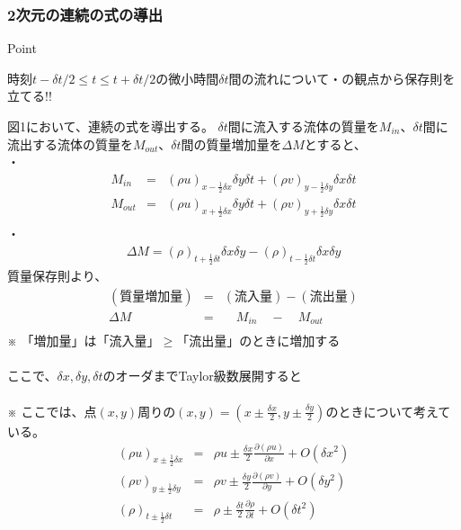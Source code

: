 \documentclass[a4paper]{jsarticle}
\begin{document}
\subsubsection{2次元の連続の式の導出}
\begin{itembox}[l]{Point}
    \begin{center}
        時刻$t-\delta t/2\leq t \leq t+\delta t/2$の微小時間$\delta t$間の流れについて・の観点から保存則を立てる!!
    \end{center}
\end{itembox}
図1において、連続の式を導出する。
\noindent$\delta t$間に流入する流体の質量を$M_{in}$、$\delta t$間に流出する流体の質量を$M_{out}$、$\delta t$間の質量増加量を$\Delta M$とすると、\\
・
\begin{eqnarray*}
    M_{in}&=&\left(\rho u\right)_{x-\frac{1}{2}\delta x}\delta y \delta t+\left(\rho v\right)_{y-\frac{1}{2}\delta y}\delta x \delta t\\
    M_{out}&=&\left(\rho u\right)_{x+\frac{1}{2}\delta x}\delta y \delta t+\left(\rho v\right)_{y+\frac{1}{2}\delta y}\delta x \delta t\\
\end{eqnarray*}
\noindent
・
\begin{eqnarray*}
    \Delta M=\left(\rho\right)_{t+\frac{1}{2}\delta t}\delta x \delta y-\left(\rho\right)_{t-\frac{1}{2}\delta t}\delta x \delta y
\end{eqnarray*}
質量保存則より、
\begin{eqnarray*}
    (質量増加量)&=&(流入量)-(流出量)\\
    \Delta M&=&\quad M_{in}\quad -\quad M_{out}\\
\end{eqnarray*}
※ 「増加量」は「流入量」$\geq$「流出量」のときに増加する\\
\\
ここで、$\delta x, \delta y, \delta t$のオーダまでTaylor級数展開すると\\
\\
※ ここでは、点$(x,y)$周りの$\left(x,y\right)=\left(x\pm \frac{\delta x}{2},y\pm \frac{\delta y}{2}\right)$のときについて考えている。
\begin{eqnarray*}
    \left(\rho u\right)_{x\pm \frac{1}{2}\delta x}&=&\rho u\pm \frac{\delta x}{2}\frac{\partial\left(\rho u\right)}{\partial x}+O\left(\delta x^2\right)\\
    \left(\rho v\right)_{y\pm \frac{1}{2}\delta y}&=&\rho v\pm \frac{\delta y}{2}\frac{\partial\left(\rho v\right)}{\partial y}+O\left(\delta y^2\right)\\
    \left(\rho\right)_{t\pm \frac{1}{2}\delta t}&=&\rho \pm \frac{\delta t}{2}\frac{\partial \rho}{\partial t}+O\left(\delta t^2\right)
\end{eqnarray*}
\end{document}
